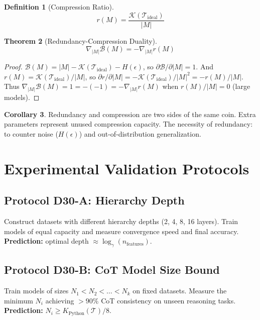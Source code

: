\documentclass[12pt]{article}
\theoremstyle{definition}
\newtheorem{definition}{Definition}[section]
\newtheorem{theorem}[definition]{Theorem}
\newtheorem{corollary}[definition]{Corollary}
\theoremstyle{remark}
\begin{document}
\begin{definition}[Compression Ratio]
\begin{equation}
r(M) = \frac{\mathcal{K}(\mathcal{T}_{\mathrm{ideal}})}{|M|}
\end{equation}
\end{definition}

\begin{theorem}[Redundancy-Compression Duality]\label{thm:duality}
\begin{equation}
\nabla_{|M|} \mathcal{B}(M) = -\nabla_{|M|} r(M)
\end{equation}
\end{theorem}

\begin{proof}
$\mathcal{B}(M) = |M| - \mathcal{K}(\mathcal{T}_{\mathrm{ideal}}) - H(\epsilon)$, so $\partial \mathcal{B}/\partial |M| = 1$. And $r(M) = \mathcal{K}(\mathcal{T}_{\mathrm{ideal}}) / |M|$, so $\partial r/\partial |M| = -\mathcal{K}(\mathcal{T}_{\mathrm{ideal}}) / |M|^2 = -r(M) / |M|$. Thus $\nabla_{|M|} \mathcal{B}(M) = 1 = -(-1) = -\nabla_{|M|} r(M)$ when $r(M)/|M| = 0$ (large models).
\end{proof}

\begin{corollary}
Redundancy and compression are two sides of the same coin. Extra parameters represent unused compression capacity. The necessity of redundancy: to counter noise ($H(\epsilon)$) and out-of-distribution generalization.
\end{corollary}

\section{Experimental Validation Protocols}

\subsection{Protocol D30-A: Hierarchy Depth}
Construct datasets with different hierarchy depths (2, 4, 8, 16 layers). Train models of equal capacity and measure convergence speed and final accuracy. \textbf{Prediction:} optimal depth $\approx \log_\gamma(n_{\mathrm{features}})$.

\subsection{Protocol D30-B: CoT Model Size Bound}
Train models of sizes $N_1 < N_2 < \ldots < N_k$ on fixed datasets. Measure the minimum $N_i$ achieving $>90\%$ CoT consistency on unseen reasoning tasks. \textbf{Prediction:} $N_i \geq K_{\mathrm{Python}}(\mathcal{T}) / 8$.
\end{document}
